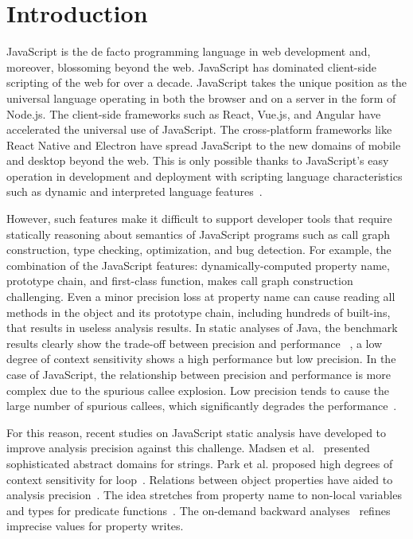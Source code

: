 \section{Introduction}\label{sec:intro}
JavaScript is the de facto programming language in web development and,
moreover, blossoming beyond the web.
JavaScript has dominated client-side scripting of the web for over a decade.
JavaScript takes the unique position as the universal language operating in both
the browser and on a server in the form of Node.js.
The client-side frameworks such as React, Vue.js, and Angular have accelerated
the universal use of JavaScript.
The cross-platform frameworks like React Native and Electron have spread
JavaScript to the new domains of mobile and desktop beyond the web.
This is only possible thanks to JavaScript's easy operation in development and
deployment with scripting language characteristics such as dynamic and
interpreted language features~\cite{weaklySPE}.


However, such features make it difficult to support developer tools that require
statically reasoning about semantics of JavaScript programs such as call graph
construction, type checking, optimization, and bug detection.
For example, the combination of the JavaScript features: dynamically-computed
property name, prototype chain, and first-class function, makes call graph
construction challenging.
Even a minor precision loss at property name can cause reading all methods in
the object and its prototype chain, including hundreds of built-ins, that
results in useless analysis results.
In static analyses of Java, the benchmark results clearly show the trade-off
between precision and performance~\cite{data-driven} \todo, a low degree of
context sensitivity shows a high performance but low precision.
In the case of JavaScript, the relationship between precision and performance is
more complex due to the spurious callee explosion.
Low precision tends to cause the large number of spurious callees, which
significantly degrades the performance~\cite{correlation, determinacy-jQuery, weaklySPE, value-refinement}.


For this reason, recent studies on JavaScript static analysis have developed
to improve analysis precision against this challenge.
Madsen et al.~\cite{string, regex, combining-string} presented sophisticated abstract domains for strings.
Park et al. proposed high degrees of context sensitivity for loop~\cite{lsaECOOP, lsaSPE}.
Relations between object properties have aided to analysis precision~\cite{correlation, weaklyAPLAS, weaklySPE}.
The idea stretches from property name to non-local variables and types for predicate functions~\cite{value-partitioning}.
The on-demand backward analyses~\cite{value-refinement} refines imprecise values for property writes.


